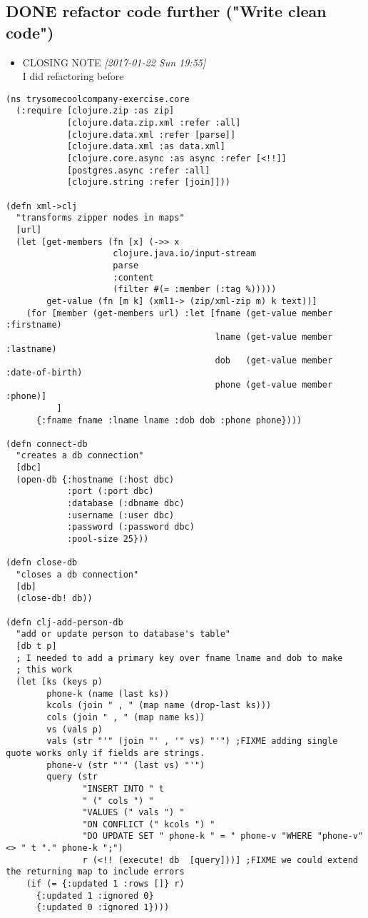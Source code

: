 \documentclass[11pt]{article}
\begin{document}
\subsection{{\bfseries\sffamily DONE} refactor code further ("Write clean code")}
\label{sec:org1b42912}
\begin{itemize}
\item CLOSING NOTE \textit{[2017-01-22 Sun 19:55] } \\
I did refactoring before
\end{itemize}
\begin{verbatim}
(ns trysomecoolcompany-exercise.core
  (:require [clojure.zip :as zip]
            [clojure.data.zip.xml :refer :all]
            [clojure.data.xml :refer [parse]]
            [clojure.data.xml :as data.xml]
            [clojure.core.async :as async :refer [<!!]]
            [postgres.async :refer :all]
            [clojure.string :refer [join]]))

(defn xml->clj
  "transforms zipper nodes in maps"
  [url]
  (let [get-members (fn [x] (->> x
                     clojure.java.io/input-stream
                     parse
                     :content
                     (filter #(= :member (:tag %)))))
        get-value (fn [m k] (xml1-> (zip/xml-zip m) k text))]
    (for [member (get-members url) :let [fname (get-value member :firstname)
                                         lname (get-value member :lastname)
                                         dob   (get-value member :date-of-birth)
                                         phone (get-value member :phone)]
          ]
      {:fname fname :lname lname :dob dob :phone phone})))

(defn connect-db
  "creates a db connection"
  [dbc]
  (open-db {:hostname (:host dbc)
            :port (:port dbc)
            :database (:dbname dbc)
            :username (:user dbc)
            :password (:password dbc)
            :pool-size 25}))

(defn close-db
  "closes a db connection"
  [db]
  (close-db! db))

(defn clj-add-person-db
  "add or update person to database's table"
  [db t p]
  ; I needed to add a primary key over fname lname and dob to make
  ; this work
  (let [ks (keys p)
        phone-k (name (last ks))
        kcols (join " , " (map name (drop-last ks)))        
        cols (join " , " (map name ks))
        vs (vals p)
        vals (str "'" (join "' , '" vs) "'") ;FIXME adding single quote works only if fields are strings.
        phone-v (str "'" (last vs) "'")
        query (str
               "INSERT INTO " t
               " (" cols ") "
               "VALUES (" vals ") "
               "ON CONFLICT (" kcols ") "
               "DO UPDATE SET " phone-k " = " phone-v "WHERE "phone-v" <> " t "." phone-k ";")
               r (<!! (execute! db  [query]))] ;FIXME we could extend the returning map to include errors
    (if (= {:updated 1 :rows []} r)
      {:updated 1 :ignored 0}
      {:updated 0 :ignored 1})))



\end{verbatim}
\end{document}
